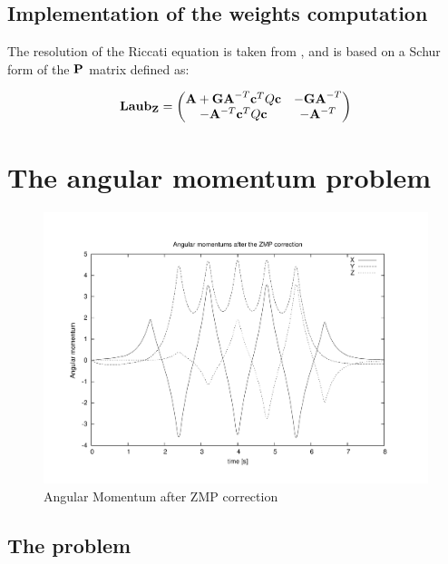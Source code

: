 \subsection{Implementation of the weights computation}
     The resolution of the Riccati equation is taken from \cite{Laub1979}, and is
     based on a Schur form of the ${\bf P}$ matrix defined as:

     \begin{equation}
     {\bf Laub_Z} =
     \left(
     \begin{matrix}
     {\bf A} + {\bf GA}^{-T}{\bf c}^TQ{\bf c} & -{\bf GA}^{-T} \\
     -{\bf A}^{-T}{\bf c}^TQ{\bf c} & -{\bf A}^{-T} \\
     \end{matrix}
     \right)
     \end{equation}

\section{The angular momentum problem}
\begin{figure}[htb]
\begin{center}
\includegraphics[width=\linewidth]{./figures/PatternGenerator/AngularMomentum}
\caption{Angular Momentum after ZMP correction}
\label{pic:AngularMomentum}
\end{center}
\end{figure}

\subsection{The problem}

